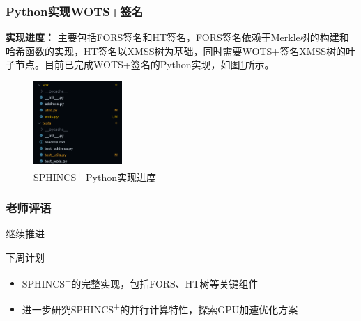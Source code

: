 \documentclass[slide]{../../custom}
\begin{document}
\begin{frame}
  \frametitle{Python实现WOTS+签名}
  \textbf{实现进度：} 主要包括FORS签名和HT签名，FORS签名依赖于Merkle树的构建和哈希函数的实现，HT签名以XMSS树为基础，同时需要WOTS+签名XMSS树的叶子节点。目前已完成WOTS+签名的Python实现，如图\ref{fig:code_py}所示。
  \begin{figure}
    \centering
    \includegraphics[width=0.3\textwidth]{fig/code_py.png}
    \caption{SPHINCS\textsuperscript{+} Python实现进度}
    \label{fig:code_py}
  \end{figure}
\end{frame}

\begin{frame}
  \frametitle{老师评语}
  \begin{alertblock}{继续推进}

  \end{alertblock}
  \begin{block}{下周计划}
    \begin{itemize}
      \item SPHINCS\textsuperscript{+}的完整实现，包括FORS、HT树等关键组件
      \item 进一步研究SPHINCS\textsuperscript{+}的并行计算特性，探索GPU加速优化方案
    \end{itemize}
  \end{block}
\end{frame}
\end{document}
